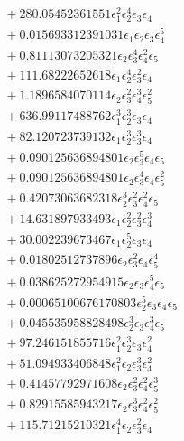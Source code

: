 \documentclass[10pt]{article}
\begin{document}
\begin{align*}
&{}  + 280.05452361551 \epsilon_{1}^{2} \epsilon_{2}^{4} \epsilon_{3} \epsilon_{4} \\
&{}  + 0.015693312391031 \epsilon_{1} \epsilon_{2} \epsilon_{3} \epsilon_{4}^{5} \\
&{}  + 0.81113073205321 \epsilon_{2} \epsilon_{3}^{4} \epsilon_{4}^{2} \epsilon_{5} \\
&{}  + 111.68222652618 \epsilon_{1} \epsilon_{2}^{4} \epsilon_{3}^{2} \epsilon_{4} \\
&{}  + 1.1896584070114 \epsilon_{2} \epsilon_{3}^{2} \epsilon_{4}^{3} \epsilon_{5}^{2} \\
&{}  + 636.99117488762 \epsilon_{1}^{3} \epsilon_{2}^{3} \epsilon_{3} \epsilon_{4} \\
&{}  + 82.120723739132 \epsilon_{1} \epsilon_{2}^{3} \epsilon_{3}^{3} \epsilon_{4} \\
&{}  + 0.090125636894801 \epsilon_{2} \epsilon_{3}^{5} \epsilon_{4} \epsilon_{5} \\
&{}  + 0.090125636894801 \epsilon_{2} \epsilon_{3}^{4} \epsilon_{4} \epsilon_{5}^{2} \\
&{}  + 0.42073063682318 \epsilon_{2}^{3} \epsilon_{3}^{2} \epsilon_{4}^{2} \epsilon_{5} \\
&{}  + 14.631897933493 \epsilon_{1} \epsilon_{2}^{2} \epsilon_{3}^{2} \epsilon_{4}^{3} \\
&{}  + 30.002239673467 \epsilon_{1} \epsilon_{2}^{5} \epsilon_{3} \epsilon_{4} \\
&{}  + 0.01802512737896 \epsilon_{2} \epsilon_{3}^{2} \epsilon_{4} \epsilon_{5}^{4} \\
&{}  + 0.038625272954915 \epsilon_{2} \epsilon_{3} \epsilon_{4}^{5} \epsilon_{5} \\
&{}  + 0.00065100676170803 \epsilon_{2}^{5} \epsilon_{3} \epsilon_{4} \epsilon_{5} \\
&{}  + 0.045535958828498 \epsilon_{2}^{3} \epsilon_{3} \epsilon_{4}^{3} \epsilon_{5} \\
&{}  + 97.246151855716 \epsilon_{1}^{2} \epsilon_{2}^{3} \epsilon_{3} \epsilon_{4}^{2} \\
&{}  + 51.094933406848 \epsilon_{1}^{2} \epsilon_{2} \epsilon_{3}^{3} \epsilon_{4}^{2} \\
&{}  + 0.41457792971608 \epsilon_{2} \epsilon_{3}^{2} \epsilon_{4}^{2} \epsilon_{5}^{3} \\
&{}  + 0.82915585943217 \epsilon_{2} \epsilon_{3}^{3} \epsilon_{4}^{2} \epsilon_{5}^{2} \\
&{}  + 115.71215210321 \epsilon_{1}^{4} \epsilon_{2} \epsilon_{3}^{2} \epsilon_{4} \\

\end{align*}
\end{document}
